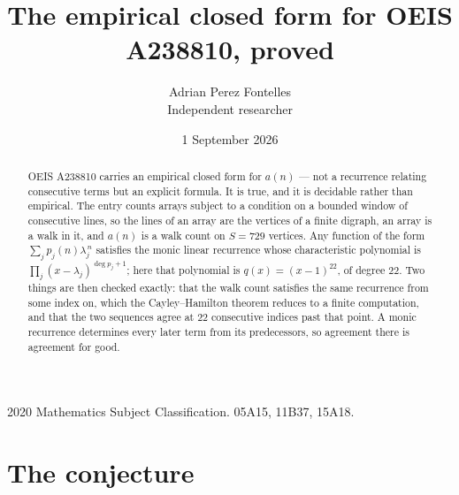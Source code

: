 \documentclass[11pt,a4paper]{article}
\title{The empirical closed form for OEIS A238810, proved}
\author{Adrian Perez Fontelles\\ \small Independent researcher}
\date{1 September 2026}
\theoremstyle{plain}
\theoremstyle{definition}
\begin{document}
\maketitle

\begin{abstract}
OEIS A238810 carries an empirical closed form for $a(n)$ --- not a recurrence relating
consecutive terms but an explicit formula. It is true, and it is decidable rather than
empirical. The entry counts arrays subject to a condition on a bounded window of consecutive lines, so the lines of an array are the
vertices of a finite digraph, an array is a walk in it, and $a(n)$ is a walk count on
$S=729$ vertices. Any function of the form $\sum_j p_j(n)\lambda_j^{\,n}$ satisfies the
monic linear recurrence whose characteristic polynomial is
$\prod_j(x-\lambda_j)^{\deg p_j+1}$; here that polynomial is $q(x)=(x-1)^{22}$, of degree
$22$. Two things are then checked exactly: that the walk count satisfies the same
recurrence from some index on, which the Cayley--Hamilton theorem reduces to a finite
computation, and that the two sequences agree at $22$ consecutive indices past that
point. A monic recurrence determines every later term from its predecessors, so agreement
there is agreement for good.
\end{abstract}

\noindent\small 2020 Mathematics Subject Classification. 05A15, 11B37, 15A18.\normalsize

\section{The conjecture}
\end{document}
